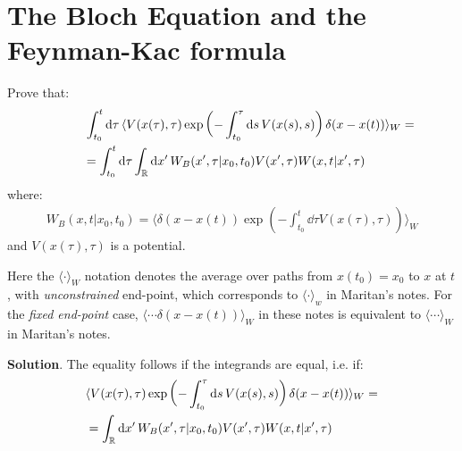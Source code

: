 \documentclass[../template.tex]{subfiles}
\begin{document}
\chapter{The Bloch Equation and the Feynman-Kac formula}
\begin{exo} Prove that:
    \begin{align*}
        \int_{t_0}^t \dd{\tau} \langle V(x(\tau), \tau) \exp\left(-\int_{t_0}^\tau \dd{s} V(x(s),s)\right) \delta(x-x(t)) \rangle_W =\\
        = \int_{t_0}^t \dd{\tau} \int_{\mathbb{R}} \dd{x'} W_B(x',\tau|x_0,t_0) V(x',\tau)W(x,t|x',\tau) \span
    \end{align*}
    where:
    \begin{align*}
        W_B(x,t|x_0,t_0) = \langle \delta(x-x(t)) \exp\left(-\int_{t_0}^t \dd{\tau} V(x(\tau), \tau)\right) \rangle_W
    \end{align*}
    and $V(x(\tau),\tau)$ is a potential.

    \begin{expl}
        Here the $\langle \cdot \rangle_W$ notation denotes the average over paths from $x(t_0) = x_0$ to $x$ at $t$, with \textit{unconstrained} end-point, which corresponds to $\langle \cdot \rangle_w$ in Maritan's notes. For the \textit{fixed end-point} case,  $\langle \cdots \delta(x-x(t))\rangle_W$ in these notes is equivalent to $\langle \cdots \rangle_W$ in Maritan's notes.
    \end{expl} 
    \medskip

    \textbf{Solution}. The equality follows if the integrands are equal, i.e. if:
    \begin{align*}
        \langle V(x(\tau), \tau) \exp\left(-\int_{t_0}^\tau \dd{s} V(x(s),s)\right) \delta(x-x(t))\rangle_W = \span\\
        &= \int_{\mathbb{R}}\dd{x'} W_B(x',\tau|x_0,t_0) V(x',\tau) W(x,t|x',\tau)
    \end{align*} 


\end{exo}
\end{document}
